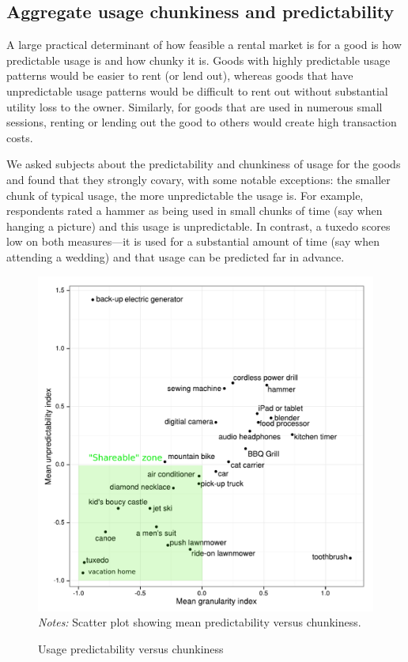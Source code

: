 \documentclass[11pt]{article}
\begin{document}
\subsection{Aggregate usage chunkiness and predictability} 
A large practical determinant of how feasible a rental market is for a good is how predictable usage is and how chunky it is. 
Goods with highly predictable usage patterns would be easier to rent (or lend out), whereas goods that have unpredictable usage patterns would be difficult to rent out without substantial utility loss to the owner.
Similarly, for goods that are used in numerous small sessions, renting or lending out the good to others would create high transaction costs.

We asked subjects about the predictability and chunkiness of usage for the goods and found that they strongly covary, with some notable exceptions:
the smaller chunk of typical usage, the more unpredictable the usage is.
For example, respondents rated a hammer as being used in small chunks of time (say when hanging a picture) and this usage is unpredictable. 
In contrast, a tuxedo scores low on both measures---it is used for a substantial amount of time (say when attending a wedding) and that usage can be predicted far in advance.  

\begin{figure}
\centering 
\caption{Usage predictability versus chunkiness \label{fig:granularity_v_predictability}}
\begin{minipage}{0.60 \linewidth}
\includegraphics[width = \linewidth]{./plots/granularity_versus_predictability.pdf} 
\emph{Notes:} Scatter plot showing mean predictability versus chunkiness. 
\end{minipage} 
\end{figure} 
\end{document}
